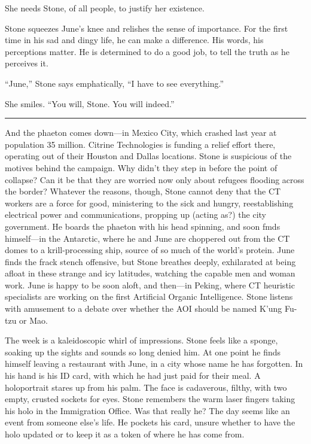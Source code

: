 She needs Stone, of all people, to justify her existence.

Stone squeezes June's knee and relishes the sense of importance. For the first time in his sad and dingy life, he can make a difference. His words, his perceptions matter. He is determined to do a good job, to tell the truth as he perceives it.

``June,'' Stone says emphatically, ``I have to see everything.''

She smiles. ``You will, Stone. You will indeed.''

\fancybreak{* * *}

And the phaeton comes down---in Mexico City, which crashed last year at population 35 million. Citrine Technologies is funding a relief effort there, operating out of their Houston and Dallas locations. Stone is suspicious of the motives behind the campaign. Why didn't they step in before the point of collapse? Can it be that they are worried now only about refugees flooding across the border? Whatever the reasons, though, Stone cannot deny that the CT workers are a force for good, ministering to the sick and hungry, reestablishing electrical power and communications, propping up (acting as?) the city government. He boards the phaeton with his head spinning, and soon fmds himself---in the Antarctic, where he and June are choppered out from the CT domes to a krill-processing ship, source of so much of the world's protein. June finds the frack stench offensive, but Stone breathes deeply, exhilarated at being afloat in these strange and icy latitudes, watching the capable men and woman work. June is happy to be soon aloft, and then---in Peking, where CT heuristic specialists are working on the first Artificial Organic Intelligence. Stone listens with amusement to a debate over whether the AOI should be named K'ung Fu-tzu or Mao.

The week is a kaleidoscopic whirl of impressions. Stone feels like a sponge, soaking up the sights and sounds so long denied him. At one point he finds himself leaving a restaurant with June, in a city whose name he has forgotten. In his hand is his ID card, with which he had just paid for their meal. A holoportrait stares up from his palm. The face is cadaverous, filthy, with two empty, crusted sockets for eyes. Stone remembers the warm laser fingers taking his holo in the Immigration Office. Was that really he? The day seems like an event from someone else's life. He pockets his card, unsure whether to have the holo updated or to keep it as a token of where he has come from.

